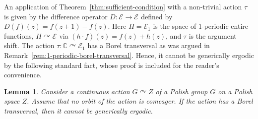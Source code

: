 \documentclass[12pt]{paper}
\numberwithin{equation}{section}
\theoremstyle{plain}
\newtheorem{lemma}[theorem]{Lemma}
\theoremstyle{definition}
\newcommand{\C}{\mathbb{C}}
\newcommand{\holom}[1][]{\mathcal{E}_{#1}}
\newcommand{\acts}{\curvearrowright}
\begin{document}
An application of Theorem~\ref{thm:sufficient-condition} with a non-trivial action \(\tau\) is given
by the difference operator \(D : \holom \to \holom\) defined by \(D(f)(z) = f(z+1)-f(z)\).  Here
\(H = \holom[1]\) is the space of \(1\)-periodic entire functions, \(H \acts \holom\) via
\((h\cdot f)(z) = f(z) + h(z)\), and \(\tau\) is the argument shift. The action
\(\tau : \C \acts \holom[1]\) has a Borel transversal as was argued in
Remark~\ref{rem:1-periodic-borel-transversal}. Hence, it cannot be generically ergodic by the
following standard fact, whose proof is included for the reader's convenience.


\begin{lemma}
  \label{lem:smooth-not-generically-ergodic}
  Consider a continuous action \(G \acts Z\) of a Polish group \(G\) on a Polish space \(Z\). Assume
  that no orbit of the action is comeager. If the action has a Borel transversal, then it cannot be
  generically ergodic.
\end{lemma}
\end{document}
